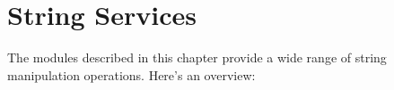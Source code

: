 \chapter{String Services}
\label{strings}

The modules described in this chapter provide a wide range of string
manipulation operations.  Here's an overview:

\localmoduletable
